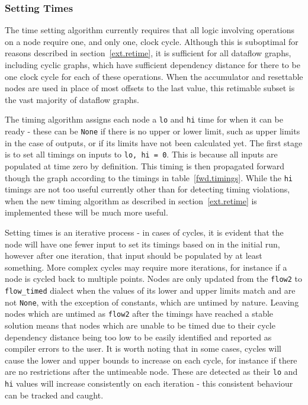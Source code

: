 \subsubsection{Setting Times}
The time setting algorithm currently requires that all logic involving operations on a node require one, and only one, clock cycle. Although this is suboptimal for reasons described in section \ref{ext.retime}, it is sufficient for all dataflow graphs, including cyclic graphs, which have sufficient dependency distance for there to be one clock cycle for each of these operations. When the accumulator and resettable nodes are used in place of most offsets to the last value, this retimable subset is the vast majority of dataflow graphs.

The timing algorithm assigns each node a \lstinline|lo| and \lstinline|hi| time for when it can be ready \hyphen{} these can be \lstinline|None| if there is no upper or lower limit, such as upper limits in the case of outputs, or if its limits have not been calculated yet. The first stage is to set all timings on inputs to \lstinline|lo, hi = 0|. This is because all inputs are populated at time zero by definition. This timing is then propagated forward though the graph according to the timings in table \ref{fwd.timings}. While the \lstinline|hi| timings are not too useful currently other than for detecting timing violations, when the new timing algorithm as described in section \ref{ext.retime} is implemented these will be much more useful.

Setting times is an iterative process \hyphen{} in cases of cycles, it is evident that the node will have one fewer input to set its timings based on in the initial run, however after one iteration, that input should be populated by at least something. More complex cycles may require more iterations, for instance if a node is cycled back to multiple points. Nodes are only updated from the \lstinline|flow2| to \lstinline|flow_timed| dialect when the values of its lower and upper limits match and are not \lstinline|None|, with the exception of constants, which are untimed by nature. Leaving nodes which are untimed as \lstinline|flow2| after the timings have reached a stable solution means that nodes which are unable to be timed due to their cycle dependency distance being too low to be easily identified and reported as compiler errors to the user. It is worth noting that in some cases, cycles will cause the lower and upper bounds to increase on each cycle, for instance if there are no restrictions after the untimeable node. These are detected as their \lstinline|lo| and \lstinline|hi| values will increase consistently on each iteration \hyphen{} this consistent behaviour can be tracked and caught.

